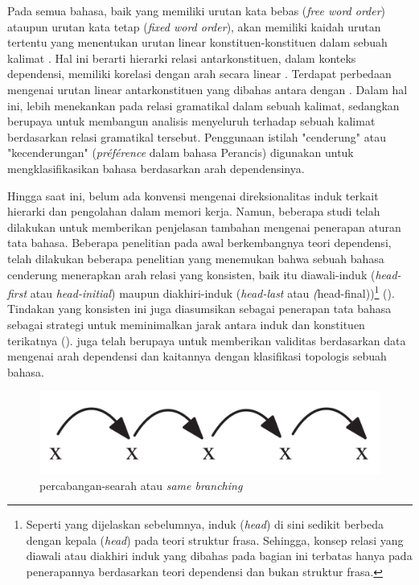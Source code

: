 Pada semua bahasa, baik yang memiliki urutan kata bebas (\textit{free word order}) ataupun urutan kata tetap (\textit{fixed word order}), akan memiliki kaidah urutan tertentu yang menentukan urutan linear konstituen-konstituen dalam sebuah kalimat \citep{tesniere1959elements}. Hal ini berarti hierarki relasi antarkonstituen, dalam konteks dependensi, memiliki korelasi dengan arah secara linear \citep{greenberg1963some}. Terdapat perbedaan mengenai urutan linear antarkonstituen yang dibahas antara \cite{tesniere1959elements} dengan \cite{greenberg1963some}.  Dalam hal ini, \cite{greenberg1963some} lebih menekankan pada relasi gramatikal dalam sebuah kalimat, sedangkan \cite{tesniere1959elements} berupaya untuk membangun analisis menyeluruh terhadap sebuah kalimat berdasarkan relasi gramatikal tersebut. Penggunaan istilah "cenderung" atau "kecenderungan" (\textit{pr{\'e}f{\'e}rence} dalam bahasa Perancis) digunakan \cite{tesniere1959elements} untuk mengklasifikasikan bahasa berdasarkan arah dependensinya.

Hingga saat ini, belum ada konvensi mengenai direksionalitas induk terkait hierarki dan pengolahan dalam memori kerja. Namun, beberapa studi telah dilakukan untuk memberikan penjelasan tambahan mengenai penerapan aturan tata bahasa. Beberapa penelitian pada awal berkembangnya teori dependensi, telah dilakukan beberapa penelitian yang menemukan bahwa sebuah bahasa cenderung menerapkan arah relasi yang konsisten, baik itu \gls{diawali-induk} (\textit{head-first} atau \textit{head-initial}) maupun \gls{diakhiri-induk} (\textit{head-last} atau \textit(head-final))\footnote{Seperti yang dijelaskan sebelumnya, induk (\textit{head}) di sini sedikit berbeda dengan kepala (\textit{head}) pada teori struktur frasa. Sehingga, konsep relasi yang diawali atau diakhiri induk yang dibahas pada bagian ini terbatas hanya pada penerapannya berdasarkan teori dependensi dan bukan struktur frasa.} (\citealp{hawkins1994performance, radford1997syntactic, vennemann1994linguistic}). Tindakan yang konsisten ini juga diasumsikan sebagai penerapan tata bahasa sebagai strategi untuk meminimalkan jarak antara induk dan konstituen terikatnya (\citealp{hawkins1994performance, frazier1985syntactic}). \cite{liu2010dependency} juga telah berupaya untuk memberikan validitas berdasarkan data mengenai arah dependensi dan kaitannya dengan klasifikasi topologis sebuah bahasa.

\begin{figure}
	\centering \includegraphics[width=0.5
	\textwidth] {pics/samebranching.png} \caption{\Gls{percabangan-searah} atau \textit{same branching}} 
\label{fig:samebranching} \end{figure}

